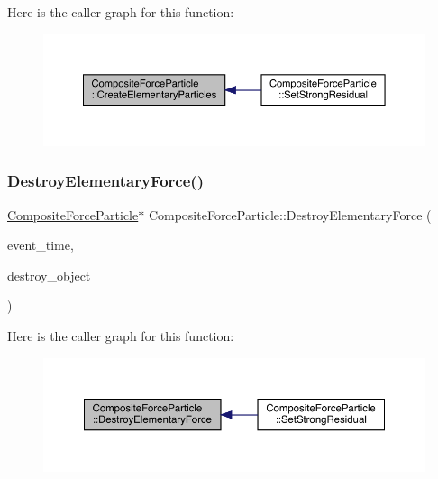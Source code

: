 Here is the caller graph for this function\+:\nopagebreak
\begin{figure}[H]
\begin{center}
\leavevmode
\includegraphics[width=350pt]{class_composite_force_particle_afff866fe6f363c33c3b49fcca9005706_icgraph}
\end{center}
\end{figure}
\mbox{\label{class_composite_force_particle_af12bbef12781e7b72a4569609f751af6}} 
\subsubsection{\texorpdfstring{Destroy\+Elementary\+Force()}{DestroyElementaryForce()}}
{\footnotesize\ttfamily \hyperlink{class_composite_force_particle}{Composite\+Force\+Particle}$\ast$ Composite\+Force\+Particle\+::\+Destroy\+Elementary\+Force (\begin{DoxyParamCaption}\item[{std\+::chrono\+::time\+\_\+point$<$ \hyperlink{universe_8h_a0ef8d951d1ca5ab3cfaf7ab4c7a6fd80}{Clock} $>$}]{event\+\_\+time,  }\item[{\hyperlink{class_composite_force_particle}{Composite\+Force\+Particle} $\ast$}]{destroy\+\_\+object }\end{DoxyParamCaption})}

Here is the caller graph for this function\+:\nopagebreak
\begin{figure}[H]
\begin{center}
\leavevmode
\includegraphics[width=350pt]{class_composite_force_particle_af12bbef12781e7b72a4569609f751af6_icgraph}
\end{center}
\end{figure}
\mbox{\label{class_composite_force_particle_af07d8607737f7881aac6314313d800e3}} 
